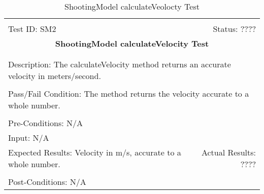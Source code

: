 \documentclass[11pt]{article}
\begin{document}
\begin{center}
\begin{table}[H]
\begin{tabular}{|l r|}\hline&\\[-2mm]
	Test ID: SM2	&Status: ????\\[-3mm]
	\multicolumn{2}{|c|}{\textbf{\large{ShootingModel calculateVelocity Test}}}\\&\\\hline&\\[-3mm]
	\multicolumn{2}{|p{\textwidth}|}{Description: The calculateVelocity method returns an accurate velocity in meters/second.}\\[1mm]\hline&\\[-3mm]
	\multicolumn{2}{|p{\textwidth}|}{Pass/Fail Condition: The method returns the velocity accurate to a whole number.}\\[1mm]\hline&\\[-3mm]
	\multicolumn{2}{|p{\textwidth}|}{Pre-Conditions: N/A}\\[4mm]
	\multicolumn{2}{|p{\textwidth}|}{Input: N/A}\\[2mm]\hline
	\multicolumn{1}{|p{0.49\textwidth}}{Expected Results: Velocity in m/s, accurate to a whole number.}	&\multicolumn{1}{|p{0.45\textwidth}|}{Actual Results: ????}\\\hline&\\[-3mm]
	\multicolumn{2}{|p{\textwidth}|}{Post-Conditions: N/A}\\\hline
\end{tabular}
\caption{ShootingModel calculateVeolocty Test}
\end{table}
\end{center}
\end{document}
